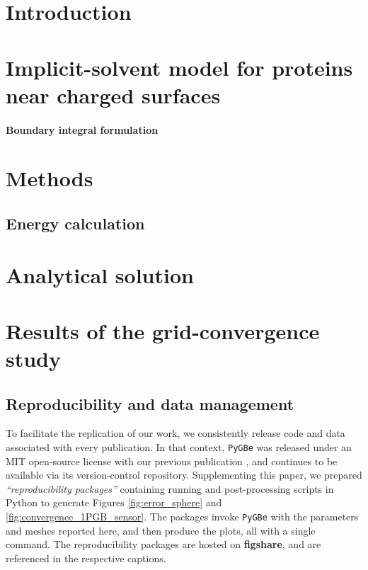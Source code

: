 \documentclass[final,5p,times,twocolumn]{elsarticle}
\newcommand{\pygbe}{\texttt{PyGBe}\xspace}
\begin{document}

\section{Introduction}\label{sec:intro}


\section{Implicit-solvent model for proteins near charged surfaces} \label{sec:implicit_solvent}
    

\paragraph*{Boundary integral formulation} \label{sec:bie}



\section{Methods}\label{sec:methods}

\subsection{Energy calculation} \label{sec:energy}




\section{Analytical solution} \label{sec:analytical_solution}


\section{Results of the grid-convergence study} \label{sec:results}


\subsection{Reproducibility and data management}
To facilitate the replication of our work, we consistently release code and data associated with every publication. In that context, \pygbe was released under an MIT open-source license with our previous publication \cite{CooperBardhanBarba2013}, and continues to be available via its version-control repository. 
Supplementing this paper, we prepared \emph{``reproducibility packages''} containing running and post-processing scripts in Python to generate Figures \ref{fig:error_sphere} and \ref{fig:convergence_1PGB_sensor}. The packages invoke \pygbe with the parameters and meshes reported here, and then produce the plots, all with a single command.
The reproducibility packages are hosted on \textbf{figshare}, and are referenced in the respective captions.
\end{document}
